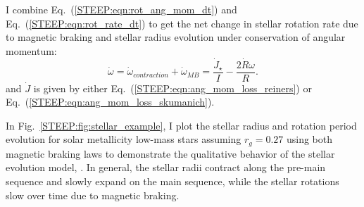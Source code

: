 I combine Eq.~(\ref{STEEP:eqn:rot_ang_mom_dt}) and Eq.~(\ref{STEEP:eqn:rot_rate_dt}) to get the net change in stellar rotation rate due to magnetic braking and stellar radius evolution under conservation of angular momentum:
\begin{equation} \label{STEEP:eqn:stellar_rot_rate_dt}
\dot{\omega} = \dot{\omega}_{contraction} + \dot{\omega}_{MB} = \frac{\dot{J}_{\star}}{I} - \frac{2 \dot{R} \omega}{R}.
\end{equation}
and $\dot{J}$ is given by either Eq.~(\ref{STEEP:eqn:ang_mom_loss_reiners}) or Eq.~(\ref{STEEP:eqn:ang_mom_loss_skumanich}).

In Fig.~\ref{STEEP:fig:stellar_example}, I plot the stellar radius and rotation period evolution for solar metallicity low-mass stars assuming $r_g = 0.27$ using both magnetic braking laws to demonstrate the qualitative behavior of the stellar evolution model, \stellar.  In general, the stellar radii contract along the pre-main sequence and slowly expand on the main sequence, while the stellar rotations slow over time due to magnetic braking.  


